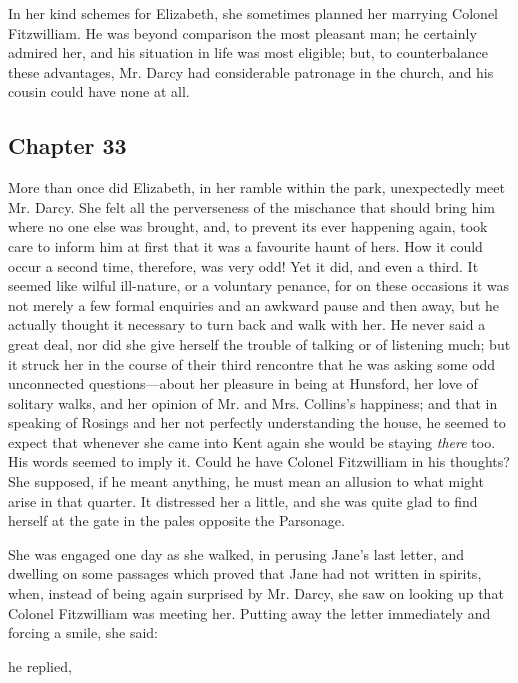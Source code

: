 In her kind schemes for Elizabeth, she sometimes planned her marrying Colonel Fitzwilliam. He was beyond comparison the most pleasant man; he certainly admired her, and his situation in life was most eligible; but, to counterbalance these advantages, Mr. Darcy had considerable patronage in the church, and his cousin could have none at all.

\subsection[chapter-33]{\useURL[url33][][][]\from[url33] Chapter 33}

More than once did Elizabeth, in her ramble within the park, unexpectedly meet Mr. Darcy. She felt all the perverseness of the mischance that should bring him where no one else was brought, and, to prevent its ever happening again, took care to inform him at first that it was a favourite haunt of hers. How it could occur a second time, therefore, was very odd! Yet it did, and even a third. It seemed like wilful ill-nature, or a voluntary penance, for on these occasions it was not merely a few formal enquiries and an awkward pause and then away, but he actually thought it necessary to turn back and walk with her. He never said a great deal, nor did she give herself the trouble of talking or of listening much; but it struck her in the course of their third rencontre that he was asking some odd unconnected questions---about her pleasure in being at Hunsford, her love of solitary walks, and her opinion of Mr. and Mrs. Collins's happiness; and that in speaking of Rosings and her not perfectly understanding the house, he seemed to expect that whenever she came into Kent again she would be staying {\em there} too. His words seemed to imply it. Could he have Colonel Fitzwilliam in his thoughts? She supposed, if he meant anything, he must mean an allusion to what might arise in that quarter. It distressed her a little, and she was quite glad to find herself at the gate in the pales opposite the Parsonage.

She was engaged one day as she walked, in perusing Jane's last letter, and dwelling on some passages which proved that Jane had not written in spirits, when, instead of being again surprised by Mr. Darcy, she saw on looking up that Colonel Fitzwilliam was meeting her. Putting away the letter immediately and forcing a smile, she said:


 he replied, 

